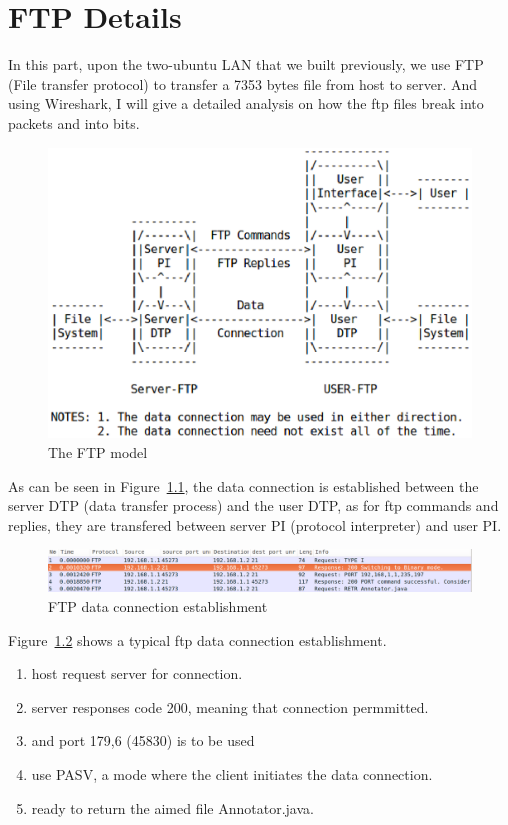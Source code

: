 \chapter{FTP Details}

In this part, upon the two-ubuntu LAN that we built previously, we use
FTP (File transfer protocol) to transfer a 7353 bytes file from host
to server. And using Wireshark, I will give a detailed analysis on how
the ftp files break into packets and into bits.

\begin{figure}[ht!]
\centering
\includegraphics[scale=0.75]{eps/ftp-model.eps}
\caption{The FTP model}
\label{ftp-model}
\end{figure}

As can be seen in Figure~\ref{ftp-model}, the data connection is established
between the server DTP (data transfer process) and the user DTP, as
for ftp commands and replies, they are transfered between server PI
(protocol interpreter) and user PI.

\begin{figure}[ht!]
\centering
\includegraphics[scale=0.35]{eps/ftp1.eps}
\caption{FTP data connection establishment}
\label{ftp1}
\end{figure}

Figure~\ref{ftp1} shows a typical ftp data connection establishment. 
\begin{enumerate}
\item host request server for connection.
\item server responses code 200, meaning that connection permmitted.
\item and port 179,6 (45830) is to be used
\item use PASV, a mode where the client initiates the data connection.
\item ready to return the aimed file Annotator.java.
\end{enumerate}

